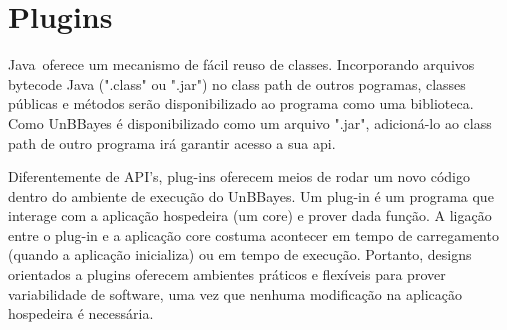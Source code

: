 \section{Plugins}
Java\texttrademark\ oferece um mecanismo de fácil reuso de classes. Incorporando arquivos bytecode Java (".class" ou ".jar") no class path de outros pogramas, classes públicas e métodos serão disponibilizado ao programa como uma biblioteca. Como UnBBayes é disponibilizado como um arquivo ".jar", adicioná-lo ao class path de outro programa irá garantir acesso a sua \gls{api}.

Diferentemente de API's, plug-ins oferecem meios de rodar um novo código dentro do ambiente de execução do UnBBayes. Um plug-in é um programa que interage com a aplicação hospedeira (um core) e prover dada função. A ligação entre o plug-in e a aplicação core costuma acontecer em tempo de carregamento (quando a aplicação inicializa) ou em tempo de execução. Portanto, designs orientados a plugins oferecem ambientes práticos e flexíveis para prover variabilidade de software, uma vez que nenhuma modificação na aplicação hospedeira é necessária.
